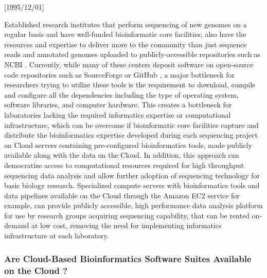 \NeedsTeXFormat{LaTeX2e}[1995/12/01] \documentclass[10pt]{bmc_article}
\newenvironment{bmcformat}{\begin{raggedright}\baselineskip20pt\sloppy\setboolean{publ}{false}}{\end{raggedright}\baselineskip20pt\sloppy}
\begin{document}
\begin{bmcformat}
Established research institutes that perform sequencing of new genomes on a regular basis and have well-funded bioinformatic 
core facilities, also have the resources and expertise to deliver more to the community than just sequence reads and annotated 
genomes uploaded to publicly-accessible repositories such as NCBI \cite{Pruitt2009}.  Currently, while many of these centers 
deposit software on open-source code repositories such as SourceForge \cite{sourceforge} or GitHub \cite{github}, a major 
bottleneck for researchers trying to utilize these tools is the requirement to download, compile and configure all the 
dependencies including the type of operating system, software libraries, and computer hardware. This creates a bottleneck 
for laboratories lacking the required informatics expertise or computational infrastructure, which can be overcome if bioinformatic
core facilities capture and distribute the bioinformatics expertise developed during each sequencing project on Cloud servers 
containing pre-configured bioinformatics tools, made publicly available along with the data on the Cloud. In addition, this 
approach can democratize access to computational resources required for high throughput sequencing data analysis and 
allow further  adoption of sequencing technology for basic biology research. Specialized compute servers with bioinformatics tools 
and data pipelines available on the Cloud through the Amazon EC2 service for example, can provide publicly accessible, 
high performance data analysis platform for use by research groups acquiring sequencing capability, that can be rented 
on-demand at low cost, removing the need for implementing informatics infrastructure at each laboratory.  


\subsubsection*{Are Cloud-Based Bioinformatics Software Suites Available on the Cloud ?}
  

\end{bmcformat}
\end{document}
